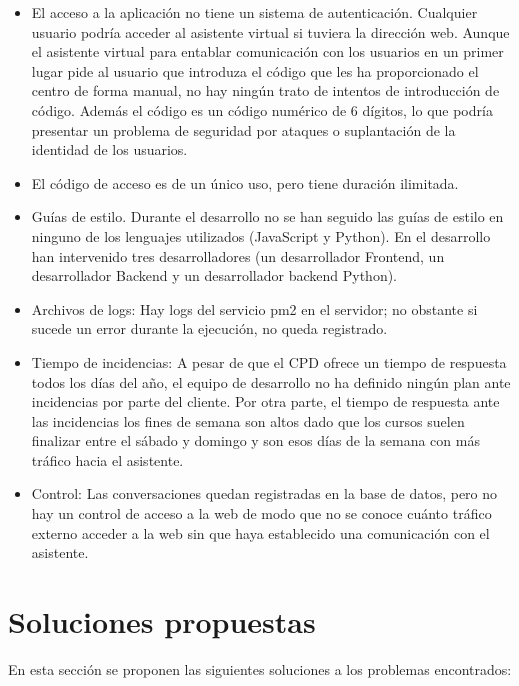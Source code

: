 \begin{itemize}
    \item El acceso a la aplicación no tiene un sistema de autenticación. Cualquier usuario podría acceder al asistente virtual si tuviera la dirección web. Aunque el asistente virtual para entablar comunicación con los usuarios en un primer lugar pide al usuario que introduza el código que les ha proporcionado el centro de forma manual, no hay ningún trato de intentos de introducción de código. Además el código es un código numérico de 6 dígitos, lo que podría presentar un problema de seguridad por ataques o suplantación de la identidad de los usuarios.
    \item El código de acceso es de un único uso, pero tiene duración ilimitada.
    \item Guías de estilo. Durante el desarrollo no se han seguido las guías de estilo en ninguno de los lenguajes utilizados (JavaScript y Python). En el desarrollo han intervenido tres desarrolladores (un desarrollador Frontend, un desarrollador Backend y un desarrollador backend Python).
    \item Archivos de logs: Hay logs del servicio pm2 en el servidor; no obstante si sucede un error durante la ejecución, no queda registrado.
    \item Tiempo de incidencias: A pesar de que el CPD ofrece un tiempo de respuesta todos los días del año, el equipo de desarrollo no ha definido ningún plan ante incidencias por parte del cliente. Por otra parte, el tiempo de respuesta ante las incidencias los fines de semana son altos dado que los cursos suelen finalizar entre el sábado y domingo y son esos días de la semana con más tráfico hacia el asistente.
    \item Control: Las conversaciones quedan registradas en la base de datos, pero no hay un control de acceso a la web de modo que no se conoce cuánto tráfico externo acceder a la web sin que haya establecido una comunicación con el asistente.
\end{itemize}


\section{Soluciones propuestas}

En esta sección se proponen las siguientes soluciones a los problemas encontrados:

